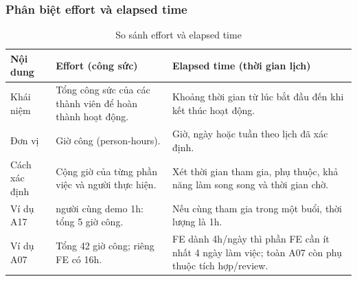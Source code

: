 \subsubsection{Phân biệt effort và elapsed time}
\begin{table}[H]
\centering
\caption{So sánh effort và elapsed time}
\footnotesize
\renewcommand{\arraystretch}{1.2}
\begin{tabularx}{\textwidth}{|p{1.55cm}|>{\raggedright\arraybackslash}X|>{\raggedright\arraybackslash}X|}
\hline
\textbf{Nội dung} & \textbf{Effort (công sức)} & \textbf{Elapsed time (thời gian lịch)} \\ \hline
Khái niệm & Tổng công sức của các thành viên để hoàn thành hoạt động. & Khoảng thời gian từ lúc bắt đầu đến khi kết thúc hoạt động. \\ \hline
Đơn vị & Giờ công (person-hours). & Giờ, ngày hoặc tuần theo lịch đã xác định. \\ \hline
Cách xác định & Cộng giờ của từng phần việc và người thực hiện. & Xét thời gian tham gia, phụ thuộc, khả năng làm song song và thời gian chờ. \\ \hline
Ví dụ A17 & 5 người cùng demo 1h: tổng 5 giờ công. & Nếu cùng tham gia trong một buổi, thời lượng là 1h. \\ \hline
Ví dụ A07 & Tổng 42 giờ công; riêng FE có 16h. & FE dành 4h/ngày thì phần FE cần ít nhất 4 ngày làm việc; toàn A07 còn phụ thuộc tích hợp/review. \\ \hline
\end{tabularx}
\end{table}

\clearpage

